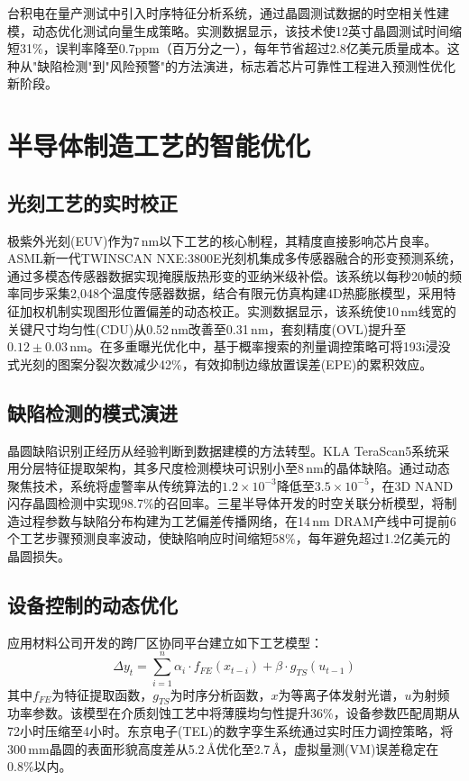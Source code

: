 \documentclass[12pt,hyperref,a4paper,UTF8]{ctexart}
\begin{document}
台积电在量产测试中引入时序特征分析系统，通过晶圆测试数据的时空相关性建模，动态优化测试向量生成策略。实测数据显示，该技术使12英寸晶圆测试时间缩短31\%，误判率降至0.7ppm（百万分之一），每年节省超过2.8亿美元质量成本。这种从"缺陷检测"到"风险预警"的方法演进，标志着芯片可靠性工程进入预测性优化新阶段。

\section{半导体制造工艺的智能优化}

\subsection{光刻工艺的实时校正}
极紫外光刻(EUV)作为7\,nm以下工艺的核心制程，其精度直接影响芯片良率。ASML新一代TWINSCAN NXE:3800E光刻机集成多传感器融合的形变预测系统，通过多模态传感器数据实现掩膜版热形变的亚纳米级补偿。该系统以每秒20帧的频率同步采集2,048个温度传感器数据，结合有限元仿真构建4D热膨胀模型，采用特征加权机制实现图形位置偏差的动态校正。实测数据显示，该系统使10\,nm线宽的关键尺寸均匀性(CDU)从0.52\,nm改善至0.31\,nm，套刻精度(OVL)提升至$0.12\pm0.03$\,nm。在多重曝光优化中，基于概率搜索的剂量调控策略可将193i浸没式光刻的图案分裂次数减少42\%，有效抑制边缘放置误差(EPE)的累积效应。

\subsection{缺陷检测的模式演进}
晶圆缺陷识别正经历从经验判断到数据建模的方法转型。KLA TeraScan5系统采用分层特征提取架构，其多尺度检测模块可识别小至8\,nm的晶体缺陷。通过动态聚焦技术，系统将虚警率从传统算法的$1.2\times10^{-3}$降低至$3.5\times10^{-5}$，在3D NAND闪存晶圆检测中实现98.7\%的召回率。三星半导体开发的时空关联分析模型，将制造过程参数与缺陷分布构建为工艺偏差传播网络，在14\,nm DRAM产线中可提前6个工艺步骤预测良率波动，使缺陷响应时间缩短58\%，每年避免超过1.2亿美元的晶圆损失。

\subsection{设备控制的动态优化}
应用材料公司开发的跨厂区协同平台建立如下工艺模型：
\begin{equation}
\Delta y_t = \sum_{i=1}^n \alpha_i \cdot f_{FE}(x_{t-i}) + \beta \cdot g_{TS}(u_{t-1})
\end{equation}
其中$f_{FE}$为特征提取函数，$g_{TS}$为时序分析函数，$x$为等离子体发射光谱，$u$为射频功率参数。该模型在介质刻蚀工艺中将薄膜均匀性提升36\%，设备参数匹配周期从72小时压缩至4小时。东京电子(TEL)的数字孪生系统通过实时压力调控策略，将300\,mm晶圆的表面形貌高度差从5.2\,\AA 优化至2.7\,\AA，虚拟量测(VM)误差稳定在0.8\%以内。
\end{document}
